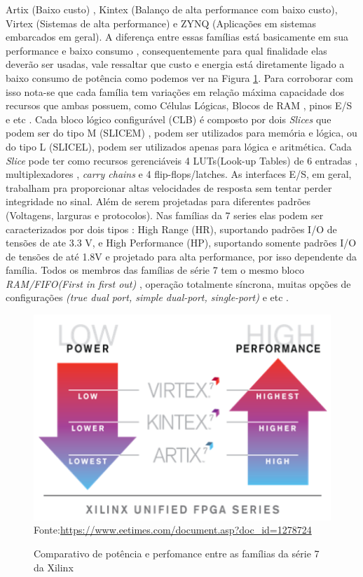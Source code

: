 Artix (Baixo custo) , Kintex (Balanço de alta performance com baixo custo), Virtex (Sistemas de alta performance) e ZYNQ (Aplicações em sistemas embarcados em geral).
A diferença entre essas famílias está basicamente em sua performance e baixo consumo , consequentemente para qual finalidade elas deverão ser usadas, vale ressaltar que custo e energia está diretamente ligado a baixo consumo de potência como podemos ver na Figura \ref{comparative}. Para corroborar com isso nota-se que cada família tem variações em relação máxima capacidade dos recursos que ambas possuem, como Células Lógicas, Blocos de RAM , pinos E/S e etc .
Cada bloco lógico configurável (CLB) é composto por dois \textit{Slices} que podem ser do tipo M (SLICEM) , podem ser utilizados para memória e lógica, ou do tipo L (SLICEL), podem ser utilizados apenas para lógica e aritmética. 
Cada \textit{Slice} pode ter como recursos gerenciáveis 4 LUTs(Look-up Tables) de 6 entradas , multiplexadores , \textit{carry chains} e 4 flip-flops/latches.
As interfaces E/S, em geral, trabalham pra proporcionar altas velocidades de resposta sem tentar perder integridade no sinal. Além de serem projetadas para diferentes padrões (Voltagens, larguras e protocolos). Nas famílias da 7 series elas podem ser caracterizados por dois tipos : High Range (HR), suportando padrões I/O de tensões de ate 3.3 V,  e High Performance (HP), suportando somente padrões I/O de tensões de até 1.8V e projetado para alta performance, por isso dependente da família.
Todos os membros das famílias de série 7 tem o mesmo bloco \textit{RAM/FIFO(First in first out)} , operação totalmente síncrona, muitas opções de configurações \textit{(true dual port, simple dual-port, single-port)} e etc \cite{demetrioarquitetura}. 

\begin{figure}[H]
	\centering
	\caption{Comparativo de potência e perfomance entre as famílias da série 7 da Xilinx}
	\includegraphics[width=13cm]{figures/xi-lite-01.png}
	{Fonte:\url{https://www.eetimes.com/document.asp?doc_id=1278724}}
	\label{comparative}
\end{figure}